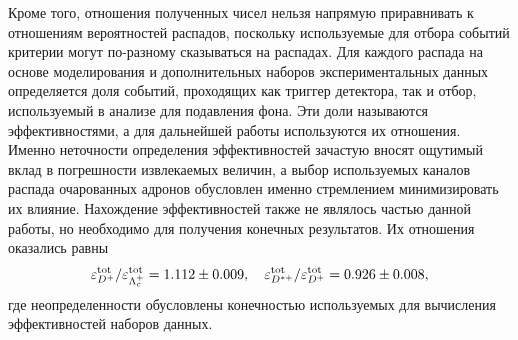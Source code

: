 Кроме того, отношения полученных чисел нельзя напрямую приравнивать 
к отношениям вероятностей распадов, поскольку используемые для отбора 
событий критерии могут по-разному сказываться на распадах. Для каждого 
распада на основе моделирования и дополнительных наборов 
экспериментальных данных определяется доля событий, проходящих как 
триггер детектора, так и отбор, используемый в анализе для подавления 
фона. Эти доли называются эффективностями, а для дальнейшей работы 
используются их отношения. Именно неточности определения эффективностей 
зачастую вносят ощутимый вклад в погрешности извлекаемых величин, 
а выбор используемых каналов распада очарованных адронов обусловлен 
именно стремлением минимизировать их влияние. Нахождение эффективностей 
также не являлось частью данной работы, но необходимо для получения 
конечных результатов. Их отношения оказались равны
\[ {\varepsilon}^\text{tot}_{D^+} / {\varepsilon}^\text{tot}_{\Lambda_c^+} = 1.112 \pm 0.009, \quad
{\varepsilon}^\text{tot}_{D^{*+}} / {\varepsilon}^\text{tot}_{D^+} = 0.926 \pm 0.008,\]
где неопределенности обусловлены конечностью используемых для вычисления 
эффективностей наборов данных.
